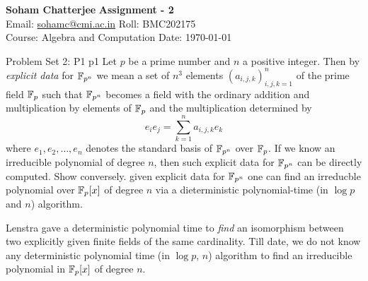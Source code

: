 \documentclass[a4paper, 11pt]{article}
\begin{document}
	
	
	\textsf{\noindent \large\textbf{Soham Chatterjee} \hfill \textbf{Assignment - 2}\\
		Email: \href{sohamc@cmi.ac.in}{sohamc@cmi.ac.in} \hfill Roll: BMC202175\\
		\normalsize Course: Algebra and Computation \hfill Date: \today}
	
	
\begin{problem}{%
		Problem Set 2: P1
	}{p1%
}
Let $p$ be a prime number and $n$ a positive integer. Then by \textit{explicit data} for $\mathbb{F}_{p^n}$ we mean a set of $n^3$ elements $(a_{i,j,k})^n_{i,j,k=1}$ of the prime field $\mathbb{F}_p$ such that $\mathbb{F}_{p^n}$ becomes a field with the ordinary addition and multiplication by elements of $\mathbb{F}_p$ and the multiplication determined by $$e_ie_j=\sum_{k=1}^na_{i,j,k}e_k$$ where $e_1,e_2,\dots, e_n$ denotes the standard basis of $\mathbb{F}_{p^n}$ over $\mathbb{F}_p$. If we know an irreducible polynomial of degree $n$, then such explicit data for $\mathbb{F}_{p^n}$ can be directly computed. Show conversely. given explicit data for $\mathbb{F}_{p^n}$ one can find an irreducble polynomial over $\mathbb{F}_{p}[x]$ of degree $n$ via a dieterministic polynomial-time (in $\log p$ and $n$) algorithm.

Lenstra gave a deterministic polynomial time to \textit{find} an isomorphism between two explicitly given
finite fields of the same cardinality. Till date, we do not know any deterministic polynomial time
(in $\log p$, $n$) algorithm to find an irreducible polynomial in $\mathbb{F}_p[x]$ of degree $n$.
\end{problem}
\end{document}
